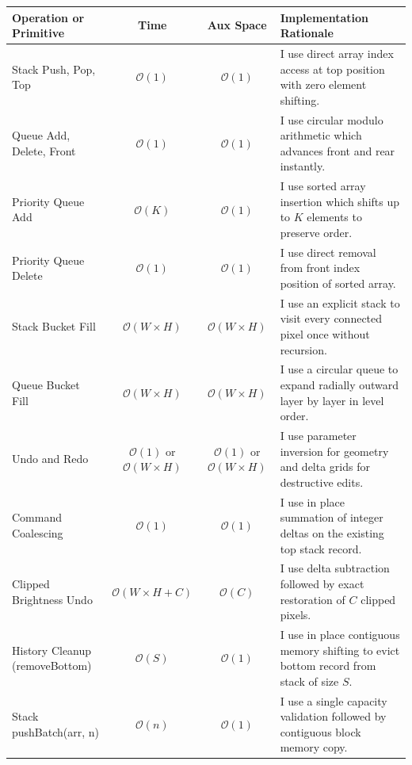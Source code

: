 \documentclass[10pt,a4paper]{article}
\begin{document}
\begin{table}[h!]
\centering
\small
\begin{tabularx}{\textwidth}{l c c X}
\toprule
\textbf{Operation or Primitive} & \textbf{Time} & \textbf{Aux Space} & \textbf{Implementation Rationale} \\
\midrule
Stack Push, Pop, Top & $\mathcal{O}(1)$ & $\mathcal{O}(1)$ & I use direct array index access at top position with zero element shifting. \\
\addlinespace[2pt]
Queue Add, Delete, Front & $\mathcal{O}(1)$ & $\mathcal{O}(1)$ & I use circular modulo arithmetic which advances front and rear instantly. \\
\addlinespace[2pt]
Priority Queue Add & $\mathcal{O}(K)$ & $\mathcal{O}(1)$ & I use sorted array insertion which shifts up to $K$ elements to preserve order. \\
\addlinespace[2pt]
Priority Queue Delete & $\mathcal{O}(1)$ & $\mathcal{O}(1)$ & I use direct removal from front index position of sorted array. \\
\addlinespace[2pt]
Stack Bucket Fill & $\mathcal{O}(W \times H)$ & $\mathcal{O}(W \times H)$ & I use an explicit stack to visit every connected pixel once without recursion. \\
\addlinespace[2pt]
Queue Bucket Fill & $\mathcal{O}(W \times H)$ & $\mathcal{O}(W \times H)$ & I use a circular queue to expand radially outward layer by layer in level order. \\
\addlinespace[2pt]
Undo and Redo & $\mathcal{O}(1)$ or $\mathcal{O}(W \times H)$ & $\mathcal{O}(1)$ or $\mathcal{O}(W \times H)$ & I use parameter inversion for geometry and delta grids for destructive edits. \\
\addlinespace[2pt]
Command Coalescing & $\mathcal{O}(1)$ & $\mathcal{O}(1)$ & I use in place summation of integer deltas on the existing top stack record. \\
\addlinespace[2pt]
Clipped Brightness Undo & $\mathcal{O}(W \times H + C)$ & $\mathcal{O}(C)$ & I use delta subtraction followed by exact restoration of $C$ clipped pixels. \\
\addlinespace[2pt]
History Cleanup (removeBottom) & $\mathcal{O}(S)$ & $\mathcal{O}(1)$ & I use in place contiguous memory shifting to evict bottom record from stack of size $S$. \\
\addlinespace[2pt]
Stack pushBatch(arr, n) & $\mathcal{O}(n)$ & $\mathcal{O}(1)$ & I use a single capacity validation followed by contiguous block memory copy. \\

\end{tabularx}
\end{table}
\end{document}
